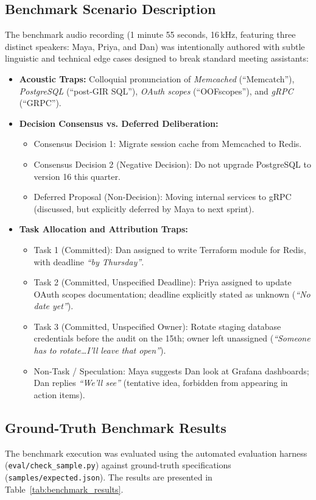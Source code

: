 \documentclass[10pt,a4paper]{article}
\begin{document}
\subsection{Benchmark Scenario Description}
The benchmark audio recording (1 minute 55 seconds, 16\,kHz, featuring three distinct speakers: Maya, Priya, and Dan) was intentionally authored with subtle linguistic and technical edge cases designed to break standard meeting assistants:
\begin{itemize}
    \item \textbf{Acoustic Traps:} Colloquial pronunciation of \textit{Memcached} (``Memcatch''), \textit{PostgreSQL} (``post-GIR SQL''), \textit{OAuth scopes} (``OOFscopes''), and \textit{gRPC} (``GRPC'').
    \item \textbf{Decision Consensus vs. Deferred Deliberation:}
    \begin{itemize}
        \item Consensus Decision 1: Migrate session cache from Memcached to Redis.
        \item Consensus Decision 2 (Negative Decision): Do not upgrade PostgreSQL to version 16 this quarter.
        \item Deferred Proposal (Non-Decision): Moving internal services to gRPC (discussed, but explicitly deferred by Maya to next sprint).
    \end{itemize}
    \item \textbf{Task Allocation and Attribution Traps:}
    \begin{itemize}
        \item Task 1 (Committed): Dan assigned to write Terraform module for Redis, with deadline \textit{``by Thursday''}.
        \item Task 2 (Committed, Unspecified Deadline): Priya assigned to update OAuth scopes documentation; deadline explicitly stated as unknown (\textit{``No date yet''}).
        \item Task 3 (Committed, Unspecified Owner): Rotate staging database credentials before the audit on the 15th; owner left unassigned (\textit{``Someone has to rotate\dots I'll leave that open''}).
        \item Non-Task / Speculation: Maya suggests Dan look at Grafana dashboards; Dan replies \textit{``We'll see''} (tentative idea, forbidden from appearing in action items).
    \end{itemize}
\end{itemize}

\subsection{Ground-Truth Benchmark Results}
The benchmark execution was evaluated using the automated evaluation harness (\texttt{eval/check\_sample.py}) against ground-truth specifications (\texttt{samples/expected.json}). The results are presented in Table~\ref{tab:benchmark_results}.
\end{document}
